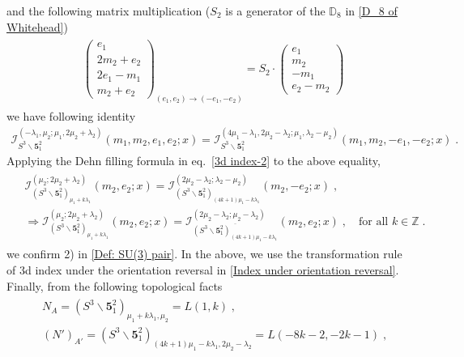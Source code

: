\documentclass[a4paper,11pt]{article}
\def\cI{\mathcal{I}}
\begin{document}
and the following matrix multiplication ($S_2$ is a generator of the $\mathbb{D}_8$ in \eqref{D_8 of Whitehead}) 
\begin{align}
\begin{split}
&\left(\begin{array}{c}e_1 \\ 2m_2 +e_2\\ 2e_1-m_1 \\ m_2+e_2\end{array}\right)_{(e_1,e_2)\rightarrow (-e_1,-e_2)}= S_2  \cdot \left(\begin{array}{c}e_1 \\ m_2 \\ -m_1 \\ e_2-m_2 \end{array}\right)\;
\end{split}
\end{align}
%
we  have following identity 
%
\begin{align}
\cI_{S^3\backslash \mathbf{5}^2_1}^{(- \lambda_1, \mu_2;\mu_1,2\mu_2+ \lambda_2)} (m_1 , m_2, e_1, e_2;x) =  \cI_{S^3\backslash \mathbf{5}^2_1}^{(4\mu_1 - \lambda_1, 2 \mu_2 - \lambda_2 ;\mu_1, \lambda_2-\mu_2)} (m_1 , m_2, -e_1, -e_2;x)\;.
\end{align}
%
Applying the Dehn filling  formula in eq.~\eqref{3d index-2} to the above equality,
%
\begin{align}
\begin{split}
&\cI_{(S^3\backslash \mathbf{5}^2_1)_{\mu_1 + k \lambda_1}}^{( \mu_2;2\mu_2+ \lambda_2)} ( m_2,  e_2;x) =  \cI_{(S^3\backslash \mathbf{5}^2_1)_{(4k+1)\mu_1 - k \lambda_1}}^{( 2 \mu_2 - \lambda_2 ;\lambda_2-\mu_2)} ( m_2, -e_2;x)\;, 
\\
&\Rightarrow  \cI_{(S^3\backslash \mathbf{5}^2_1)_{\mu_1 + k \lambda_1}}^{( \mu_2;2\mu_2+ \lambda_2)} ( m_2,  e_2;x) =  \cI_{\overline{(S^3\backslash \mathbf{5}^2_1)_{(4k+1)\mu_1 - k \lambda_1}}}^{( 2 \mu_2 - \lambda_2 ;\mu_2-\lambda_2)} ( m_2, e_2;x)\;, \quad \textrm{for all $k\in \mathbb{Z}$}\;.
\end{split}
\end{align}
%
we confirm 2) in  \eqref{Def: SU(3) pair}. 
In the above, we use the transformation rule of 3d index under the orientation reversal in \eqref{Index under orientation reversal}.
Finally, from the following topological facts \cite{martelli2002dehn}
%
\begin{align}
\begin{split}
&N_A = (S^3\backslash \mathbf{5}^2_1)_{\mu_1+k \lambda_1, \mu_2}= L(1,k)\;, 
\\
&  (N')_{A'}=(S^3\backslash \mathbf{5}^2_1)_{(4k+1)\mu_1- k \lambda_1,2\mu_2- \lambda_2} = L(-8k-2,-2k-1)\;,
\end{split}
\end{align}
\end{document}
